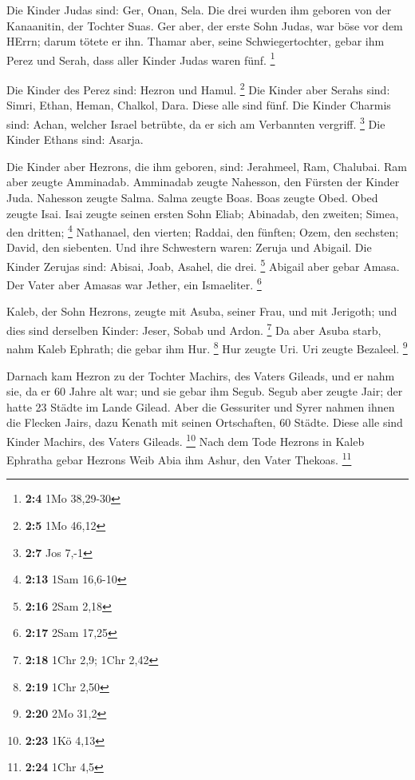  Die Kinder Judas sind: Ger, Onan, Sela. Die drei wurden ihm
geboren von der Kanaanitin, der Tochter Suas. Ger aber, der erste Sohn
Judas, war böse vor dem HErrn; darum tötete er ihn.  Thamar
aber, seine Schwiegertochter, gebar ihm Perez und Serah, dass aller
Kinder Judas waren fünf. \footnote{\textbf{2:4} 1Mo 38,29-30}

 Die Kinder des Perez sind: Hezron und Hamul. \footnote{\textbf{2:5}
  1Mo 46,12}  Die Kinder aber Serahs sind: Simri, Ethan,
Heman, Chalkol, Dara. Diese alle sind fünf.  Die Kinder
Charmis sind: Achan, welcher Israel betrübte, da er sich am Verbannten
vergriff. \footnote{\textbf{2:7} Jos 7,-1}  Die Kinder
Ethans sind: Asarja.

 Die Kinder aber Hezrons, die ihm geboren, sind: Jerahmeel,
Ram, Chalubai.  Ram aber zeugte Amminadab. Amminadab zeugte
Nahesson, den Fürsten der Kinder Juda.  Nahesson zeugte
Salma. Salma zeugte Boas.  Boas zeugte Obed. Obed zeugte
Isai.  Isai zeugte seinen ersten Sohn Eliab; Abinadab, den
zweiten; Simea, den dritten; \footnote{\textbf{2:13} 1Sam 16,6-10}
 Nathanael, den vierten; Raddai, den fünften; 
Ozem, den sechsten; David, den siebenten.  Und ihre
Schwestern waren: Zeruja und Abigail. Die Kinder Zerujas sind: Abisai,
Joab, Asahel, die drei. \footnote{\textbf{2:16} 2Sam 2,18} 
Abigail aber gebar Amasa. Der Vater aber Amasas war Jether, ein
Ismaeliter. \footnote{\textbf{2:17} 2Sam 17,25}

 Kaleb, der Sohn Hezrons, zeugte mit Asuba, seiner Frau,
und mit Jerigoth; und dies sind derselben Kinder: Jeser, Sobab und
Ardon. \footnote{\textbf{2:18} 1Chr 2,9; 1Chr 2,42}  Da
aber Asuba starb, nahm Kaleb Ephrath; die gebar ihm Hur. \footnote{\textbf{2:19}
  1Chr 2,50}  Hur zeugte Uri. Uri zeugte Bezaleel.
\footnote{\textbf{2:20} 2Mo 31,2}

 Darnach kam Hezron zu der Tochter Machirs, des Vaters
Gileads, und er nahm sie, da er 60 Jahre alt war; und sie gebar ihm
Segub.  Segub aber zeugte Jair; der hatte 23 Städte im
Lande Gilead.  Aber die Gessuriter und Syrer nahmen ihnen
die Flecken Jairs, dazu Kenath mit seinen Ortschaften, 60 Städte. Diese
alle sind Kinder Machirs, des Vaters Gileads. \footnote{\textbf{2:23}
  1Kö 4,13}  Nach dem Tode Hezrons in Kaleb Ephratha gebar
Hezrons Weib Abia ihm Ashur, den Vater Thekoas. \footnote{\textbf{2:24}
  1Chr 4,5}


